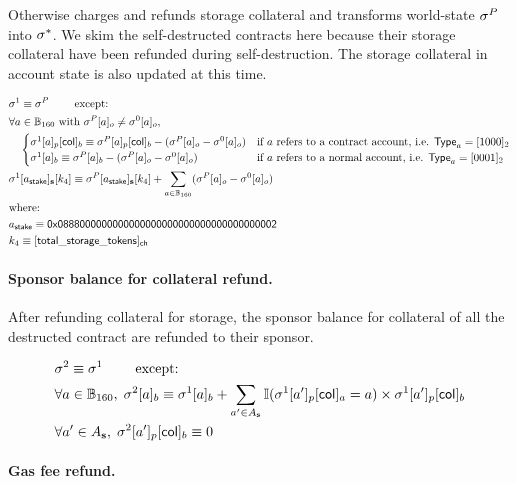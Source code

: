 Otherwise \name charges and refunds storage collateral and transforms world-state $\mathbf{\sigma}^P$ into $\mathbf{\sigma}^*$. 
We skim the self-destructed contracts here because their storage collateral have been refunded during self-destruction. 
The storage collateral in account state is also updated at this time. 

\begin{align}
	&\st^1  \eqdef \st^{P} \qquad \mbox{  except:}\\
	&\forall a \in \B_{160} \text{ with } \st^{P}[a]_o\neq\st^0[a]_o, \\
	&\quad \begin{cases}
	\st^1[a]_p[{\sf col}]_b \eqdef \st^{P}[a]_p[{\sf col}]_b - (\st^{P}[a]_o-\st^0[a]_o) & \mbox{if $a$ refers to a contract account, i.e. $\mathsf{Type}_{a}=\typecontract$} \\
	\st^1[a]_b \eqdef \st^{P}[a]_b - (\st^{P}[a]_o-\st^0[a]_o) & \mbox{if $a$ refers to a normal account, i.e. $\mathsf{Type}_{a}= \typenormal$}
	\end{cases}\\
	&\st^1[a_{\sf stake}]_{\bf s}[k_4] \eqdef \st^P[a_{\sf stake}]_{\bf s}[k_4] + \sum_{a\in \B_{160}}(\st^{P}[a]_o-\st^0[a]_o) \\
	&\mbox{where:}  \\
	&a_{\sf stake} \eqdef \stakingcontract \\ 
	&k_4 \eqdef {\sf [total\char`_storage\char`_tokens]_{\sf ch}} 
\end{align}

\paragraph{Sponsor balance for collateral refund.}

After refunding collateral for storage, the sponsor balance for collateral of all the destructed contract are refunded to their sponsor.

\begin{align}
	&\mathbf{\sigma}^2  \equiv \mathbf{\sigma}^1 \qquad \mbox{  except:}\\
	&\forall a \in \mathbb{B}_{160},\;  \mathbf{\sigma}^2[a]_b\equiv \mathbf{\sigma}^1[a]_b + \sum_{a'\in A_{\bf s}} \mathbb{I}(\mathbf{\sigma}^1[a']_p[{\sf col}]_a=a)\times \mathbf{\sigma}^1[a']_p[{\sf col}]_b \\
	&\forall a' \in A_{\bf s},\; \mathbf{\sigma}^2[a']_p[{\sf col}]_b\equiv 0
\end{align}


\paragraph{Gas fee refund.}


